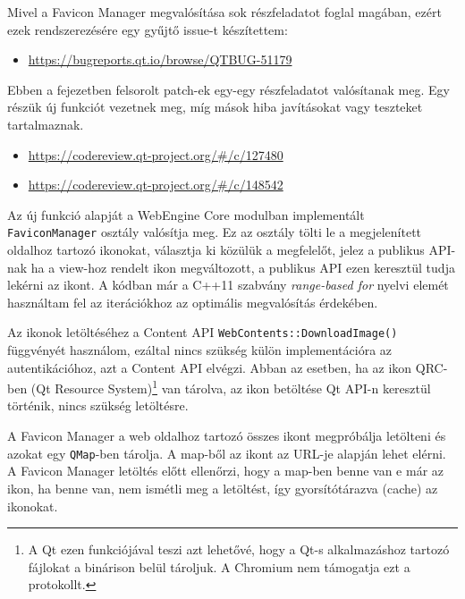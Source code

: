 \documentclass[12pt]{report}
\let\origurl\url
\renewcommand{\url}[1]{%
    \textcolor{blue}{\origurl{#1}}
}
\newcommand{\gerrit}[1]{%
    \textcolor{qtgreen}{\origurl{https://codereview.qt-project.org/\#/c/#1}}
}
\newcommand{\qtbug}[1]{%
    \textcolor{qtred}{\origurl{https://bugreports.qt.io/browse/QTBUG-#1}}
}
\begin{document}
Mivel a Favicon Manager megvalósítása sok részfeladatot foglal magában, ezért ezek
rendszerezésére egy gyűjtő issue-t készítettem:
\begin{center}
    \begin{issuebox}
        \begin{itemize}
            \renewcommand{\labelitemi}{\textcolor{qtred}{$\blacktriangleright$}}
            \item \qtbug{51179}
        \end{itemize}
    \end{issuebox}
\end{center}
Ebben a fejezetben felsorolt patch-ek egy-egy részfeladatot valósítanak meg. Egy részük
új funkciót vezetnek meg, míg mások hiba javításokat vagy teszteket tartalmaznak.

\begin{center}
    \begin{reviewbox}
        \begin{itemize}
            \renewcommand{\labelitemi}{\textcolor{qtgreen}{$\blacktriangleright$}}
            \item \gerrit{127480}
            \item \gerrit{148542}
        \end{itemize}
    \end{reviewbox}
\end{center}

Az új funkció alapját a WebEngine Core modulban implementált \texttt{FaviconManager} osztály
valósítja meg. Ez az osztály tölti le a megjelenített oldalhoz tartozó ikonokat,
választja ki közülük a megfelelőt, jelez a publikus API-nak ha a view-hoz rendelt ikon
megváltozott, a publikus API ezen keresztül tudja lekérni az ikont.
A kódban már a C++11 szabvány \textit{range-based for} nyelvi elemét használtam fel az
iterációkhoz az optimális megvalósítás érdekében.

Az ikonok letöltéséhez a Content API \texttt{WebContents::DownloadImage()} függvényét
használom, ezáltal nincs szükség külön implementációra az autentikációhoz, azt a Content API
elvégzi. Abban az esetben, ha az ikon QRC-ben (Qt Resource System)\footnote{A Qt ezen
    funkciójával teszi azt lehetővé, hogy a Qt-s alkalmazáshoz tartozó fájlokat a
    binárison belül tároljuk. A Chromium nem támogatja ezt a protokollt.}
van tárolva, az ikon betöltése Qt API-n keresztül történik, nincs szükség letöltésre.

A Favicon Manager a web oldalhoz tartozó összes ikont megpróbálja letölteni és azokat egy
\texttt{QMap}-ben tárolja. A map-ből az ikont az URL-je alapján lehet elérni. A Favicon
Manager letöltés előtt ellenőrzi, hogy a map-ben benne van e már az ikon, ha benne van,
nem ismétli meg a letöltést, így gyorsítótárazva (cache) az ikonokat.
\end{document}
